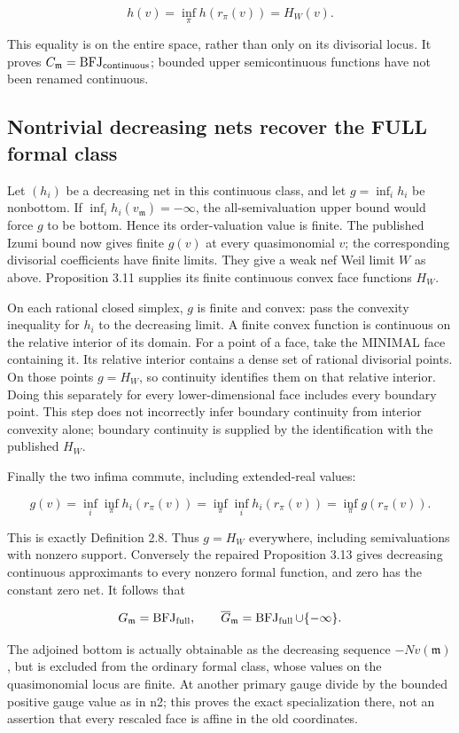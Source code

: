 \documentclass[11pt]{article}
\begin{document}
\[
h(v)=\inf_\pi h(r_\pi(v))=H_W(v).
\]

This equality is on the entire space, rather than only on its divisorial locus. It proves $C_{\mathfrak m}=\operatorname{BFJ}_{\rm continuous}$; bounded upper semicontinuous functions have not been renamed continuous.

\subsection{Nontrivial decreasing nets recover the FULL formal class}

Let $(h_i)$ be a decreasing net in this continuous class, and let $g=\inf_i h_i$ be nonbottom. If $\inf_i h_i(v_{\mathfrak m})=-\infty$, the all-semivaluation upper bound would force $g$ to be bottom. Hence its order-valuation value is finite. The published Izumi bound now gives finite $g(v)$ at every quasimonomial $v$; the corresponding divisorial coefficients have finite limits. They give a weak nef Weil limit $W$ as above. Proposition 3.11 supplies its finite continuous convex face functions $H_W$.

On each rational closed simplex, $g$ is finite and convex: pass the convexity inequality for $h_i$ to the decreasing limit. A finite convex function is continuous on the relative interior of its domain. For a point of a face, take the MINIMAL face containing it. Its relative interior contains a dense set of rational divisorial points. On those points $g=H_W$, so continuity identifies them on that relative interior. Doing this separately for every lower-dimensional face includes every boundary point. This step does not incorrectly infer boundary continuity from interior convexity alone; boundary continuity is supplied by the identification with the published $H_W$.

Finally the two infima commute, including extended-real values:

\[
g(v)=\inf_i\inf_\pi h_i(r_\pi(v))=\inf_\pi\inf_i h_i(r_\pi(v))=\inf_\pi g(r_\pi(v)).
\]

This is exactly Definition 2.8. Thus $g=H_W$ everywhere, including semivaluations with nonzero support. Conversely the repaired Proposition 3.13 gives decreasing continuous approximants to every nonzero formal function, and zero has the constant zero net. It follows that

\[
G_{\mathfrak m}=\operatorname{BFJ}_{\rm full},\qquad \overline G_{\mathfrak m}=\operatorname{BFJ}_{\rm full}\cup\{-\infty\}.
\]

The adjoined bottom is actually obtainable as the decreasing sequence $-N v(\mathfrak m)$, but is excluded from the ordinary formal class, whose values on the quasimonomial locus are finite. At another primary gauge divide by the bounded positive gauge value as in n2; this proves the exact specialization there, not an assertion that every rescaled face is affine in the old coordinates.
\end{document}
